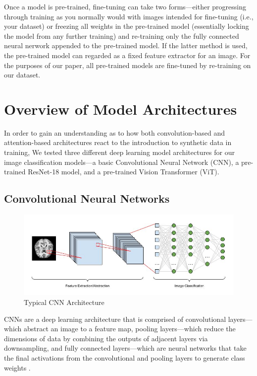 \documentclass [MAS] {uclathes}
\begin{document}
Once a model is pre-trained, fine-tuning can take two forms---either progressing through training as you normally would
with images intended for fine-tuning (i.e., your dataset) or freezing all weights in the pre-trained model (essentially 
locking the model from any further training) and re-training only the fully connected neural nerwork appended to the 
pre-trained model. If the latter method is used, the pre-trained model can regarded as a fixed feature extractor for an 
image. For the purposes of our paper, all pre-trained models are fine-tuned by re-training on our dataset.

\chapter{Overview of Model Architectures}
In order to gain an understanding as to how both convolution-based and attention-based architectures react to the 
introduction to synthetic data in training, We tested three different deep learning model architectures for our image 
classification models---a basic Convolutional Neural Network (CNN), a pre-trained ResNet-18 model, and a pre-trained 
Vision Transformer (ViT).

\section{Convolutional Neural Networks}

\begin{figure}[h]
    \centering
    \includegraphics[width=0.9\linewidth]{figures/CNN-diagram.jpg}
    \caption{Typical CNN Architecture \cite{cnn_diagram}}
\end{figure}

CNNs are a deep learning architecture that is comprised of convolutional layers---which abstract an image to a feature 
map, pooling layers---which reduce the dimensions of data by combining the outputs of adjacent layers via downsampling, 
and fully connected layers---which are neural networks that take the final activations from the convolutional and 
pooling layers to generate class weights \cite{cnn_intro}.
\end{document}
